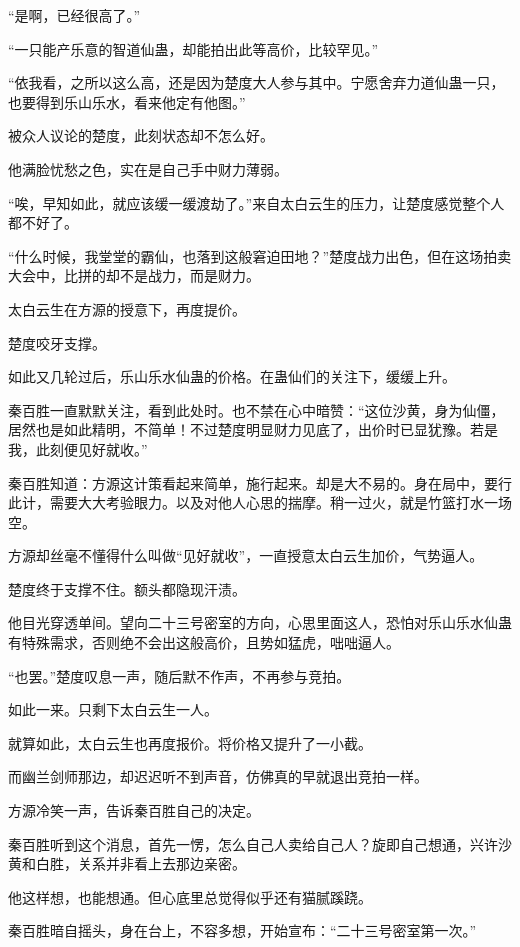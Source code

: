 \begin{this_body}
“是啊，已经很高了。”

“一只能产乐意的智道仙蛊，却能拍出此等高价，比较罕见。”

“依我看，之所以这么高，还是因为楚度大人参与其中。宁愿舍弃力道仙蛊一只，也要得到乐山乐水，看来他定有他图。”

被众人议论的楚度，此刻状态却不怎么好。

他满脸忧愁之色，实在是自己手中财力薄弱。

“唉，早知如此，就应该缓一缓渡劫了。”来自太白云生的压力，让楚度感觉整个人都不好了。

“什么时候，我堂堂的霸仙，也落到这般窘迫田地？”楚度战力出色，但在这场拍卖大会中，比拼的却不是战力，而是财力。

太白云生在方源的授意下，再度提价。

楚度咬牙支撑。

如此又几轮过后，乐山乐水仙蛊的价格。在蛊仙们的关注下，缓缓上升。

秦百胜一直默默关注，看到此处时。也不禁在心中暗赞：“这位沙黄，身为仙僵，居然也是如此精明，不简单！不过楚度明显财力见底了，出价时已显犹豫。若是我，此刻便见好就收。”

秦百胜知道：方源这计策看起来简单，施行起来。却是大不易的。身在局中，要行此计，需要大大考验眼力。以及对他人心思的揣摩。稍一过火，就是竹篮打水一场空。

方源却丝毫不懂得什么叫做“见好就收”，一直授意太白云生加价，气势逼人。

楚度终于支撑不住。额头都隐现汗渍。

他目光穿透单间。望向二十三号密室的方向，心思里面这人，恐怕对乐山乐水仙蛊有特殊需求，否则绝不会出这般高价，且势如猛虎，咄咄逼人。

“也罢。”楚度叹息一声，随后默不作声，不再参与竞拍。

如此一来。只剩下太白云生一人。

就算如此，太白云生也再度报价。将价格又提升了一小截。

而幽兰剑师那边，却迟迟听不到声音，仿佛真的早就退出竞拍一样。

方源冷笑一声，告诉秦百胜自己的决定。

秦百胜听到这个消息，首先一愣，怎么自己人卖给自己人？旋即自己想通，兴许沙黄和白胜，关系并非看上去那边亲密。

他这样想，也能想通。但心底里总觉得似乎还有猫腻蹊跷。

秦百胜暗自摇头，身在台上，不容多想，开始宣布：“二十三号密室第一次。”


\end{this_body}
